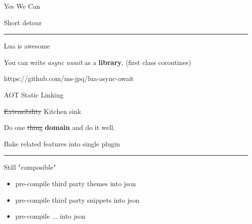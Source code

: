 \documentclass{beamer}
\begin{document}
\begin{frame}{Yes We Can}

	Short detour

	\rule{\textwidth}{0.1em}

	Lua is awesome

	You can write \textit{async await} as a \textbf{library}, (first class coroutines)

	https://github.com/ms-jpq/lua-async-await

\end{frame}







\begin{frame}{AOT Static Linking}

	\begin{block}{\st{Extensibility} Kitchen sink}

		\vspace{0.5em}

		Do one \st{thing} \textbf{domain} and do it well.

		\vspace{0.5em}

	\end{block}

	Bake related features into single plugin

	\rule{\textwidth}{0.1em}

	Still "composible"

	\begin{itemize}

		\item pre-compile third party themes into json

		\item pre-compile third party snippets into json

		\item pre-compile ... into json

	\end{itemize}

\end{frame}
\end{document}
